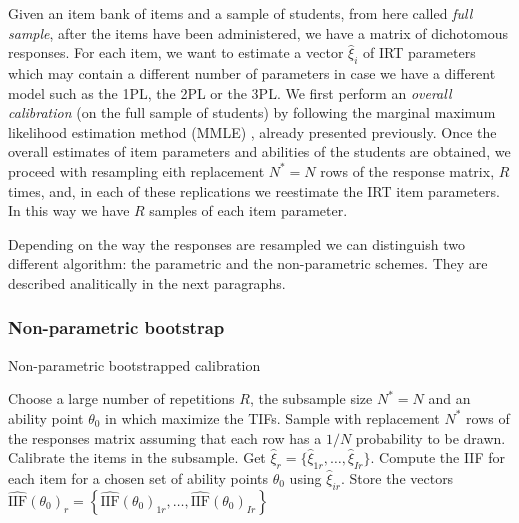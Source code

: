 Given an item bank of items and a sample of students, from here called \emph{full sample}, after the items have been administered, we have a matrix of dichotomous responses. For each item, we want to estimate a vector $\hat{\xi}_i$ of IRT parameters which may contain a different number of parameters in case we have a different model such as the 1PL, the 2PL or the 3PL. 
We first perform an \emph{overall calibration} (on the full sample of students) by following the marginal maximum likelihood estimation method (MMLE) \textcite{bock1981marginal}, already presented previously. Once the overall estimates of item parameters and abilities of the students are obtained, we proceed with resampling eith replacement $N^* = N$ rows of the response matrix, $R$ times, and, in each of these replications we reestimate the IRT item parameters. In this way we have $R$ samples of each item parameter. 

Depending on the way the responses are resampled we can distinguish two different algorithm: the parametric and the non-parametric schemes. They are described analitically in the next paragraphs.

\subsubsection{Non-parametric bootstrap}

\begin{algorithm}[h]
	\caption{Non-parametric bootstrapped calibration}
	\begin{algorithmic}
		\State Choose a large number of repetitions $R$, the subsample size $N^* = N$ and an ability point $\theta_0$ in which maximize the TIFs.
		\State Sample with replacement $N^*$ rows of the responses matrix assuming that each row has a $1/N$ probability to be drawn. 
		\State Calibrate the items in the subsample. Get $\hat{\xi}_{r}=\{\hat{\xi}_{1r},\ldots,\hat{\xi}_{Ir}\}$.
		\State Compute the IIF for each item for a chosen set of ability points $\mathbb{\theta}_0$ using $\hat{\xi}_{ir}$.
		\State Store the vectors $\hat{\text{IIF}}(\theta_0)_{r}=\left\{\hat{\text{IIF}}(\theta_0)_{1r},\ldots,\hat{\text{IIF}}(\theta_0)_{Ir} \right\}$
		\EndFor
	\end{algorithmic}
\end{algorithm}

